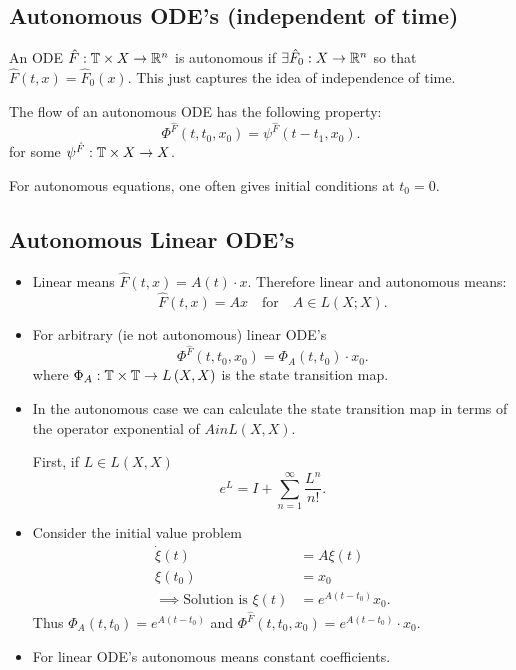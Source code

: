 \subsection{Autonomous ODE's (independent of time)}

An ODE $\hat{F} : \mathbb{T} \times  X  \to \mathbb{R} ^{n} $ is autonomous if $\exists  \hat{F}_{0} : X  \to \mathbb{R}^{n}$ so that $\hat{F}\left( t, x \right) = \hat{F} _{0}\left( x \right) $. This just captures the idea of independence of time. 

The flow of an autonomous ODE has the following property:
\[
	\Phi ^{\hat{F}}\left( t, t_0, x_0 \right)  = \psi^{\hat{F}}\left( t - t_1, x_0 \right) 
.\] 
for some $\psi^{\hat{F}} : \mathbb{T} \times  X \to X$. 

For autonomous equations, one often gives initial conditions at $t_0 = 0 $. 

\subsection{Autonomous Linear ODE's}

\begin{itemize}
	\item Linear means $\hat{F}\left( t, x \right)  = A\left( t \right) \cdot x$. Therefore linear and autonomous means: 
		 \[
			 \hat{F}\left( t, x \right)  = Ax \quad \text{for} \quad A \in  L\left( X;X \right) 
		.\] 
	\item For arbitrary (ie not autonomous) linear ODE's
		 \[
			 \Phi^{\hat{F}}\left( t, t_0, x_0 \right)  = \Phi_{A}\left( t, t_0 \right) \cdot x_0
		.\] 
		where $\Phi_{A} : \mathbb{T} \times \mathbb{T} \to L\left( X, X \right) $ is the state transition map. 

	\item In the autonomous case we can calculate the state transition map in terms of the operator exponential of $A in L\left( X, X \right) $. 

		First, if $L \in  L\left( X, X \right) $ 
		\[
		e^{L} = I + \sum_{n=1}^{\infty} \frac{L^{n}}{n!} 
		.\] 

	\item Consider the initial value problem
		\begin{align*}
			\dot{\xi}\left( t \right) &= A \xi\left( t \right)  \\
			\xi\left( t_0 \right) &= x_0 \\
			\implies \text{Solution is } \xi\left( t \right)  &= e^{A\left( t - t_0 \right) }x_0
		.\end{align*}
		Thus $\Phi_{A}\left( t, t_0 \right) = e^{A\left( t - t_0 \right) }$ and $\Phi^{\hat{F}}\left( t, t_0, x_0 \right) = e^{A\left( t - t_0 \right) }\cdot x_0$. 

	\item For linear ODE's autonomous means constant coefficients. 
\end{itemize}

